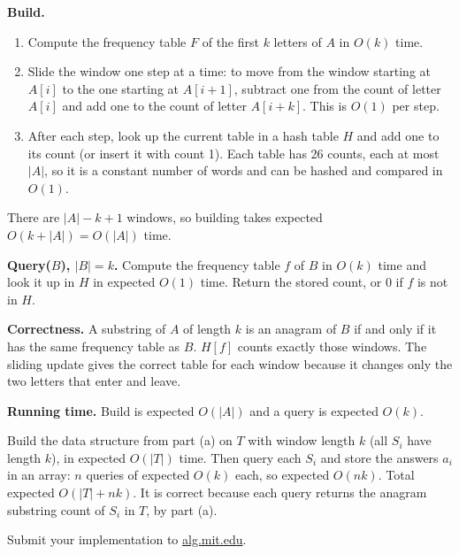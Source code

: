 \documentclass[12pt,twoside]{article}
\begin{document}
\begin{problems}
\begin{problemparts}
\textbf{Build.}
\begin{enumerate}
\item Compute the frequency table $F$ of the first $k$ letters of $A$ in $O(k)$ time.
\item Slide the window one step at a time: to move from the window starting at $A[i]$ to the
one starting at $A[i+1]$, subtract one from the count of letter $A[i]$ and add one to the count of
letter $A[i+k]$. This is $O(1)$ per step.
\item After each step, look up the current table in a hash table $H$ and add one to its count
(or insert it with count 1). Each table has 26 counts, each at most $|A|$, so it is a
constant number of words and can be hashed and compared in $O(1)$.
\end{enumerate}
There are $|A|-k+1$ windows, so building takes expected $O(k+|A|)=O(|A|)$ time.

\textbf{Query($B$), $|B|=k$.} Compute the frequency table $f$ of $B$ in $O(k)$ time and look it up
in $H$ in expected $O(1)$ time. Return the stored count, or 0 if $f$ is not in $H$.

\textbf{Correctness.} A substring of $A$ of length $k$ is an anagram of $B$ if and only if it has
the same frequency table as $B$. $H[f]$ counts exactly those windows. The sliding update gives the
correct table for each window because it changes only the two letters that enter and leave.

\textbf{Running time.} Build is expected $O(|A|)$ and a query is expected $O(k)$.

\problempart %
Build the data structure from part (a) on $T$ with window length $k$ (all $S_i$ have length $k$), in
expected $O(|T|)$ time. Then query each $S_i$ and store the answers $a_i$ in an array: $n$
queries of expected $O(k)$ each, so expected $O(nk)$. Total expected $O(|T|+nk)$. It is correct because each
query returns the anagram substring count of $S_i$ in $T$, by part (a).

\problempart Submit your implementation to {\small\url{alg.mit.edu}}.
\end{problemparts}

\end{problems}
\end{document}
